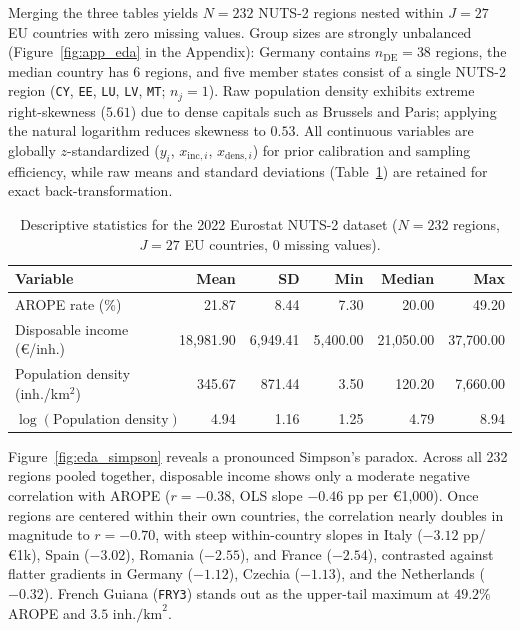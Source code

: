 \documentclass[11pt,a4paper]{article}
\begin{document}
Merging the three tables yields $N = 232$ NUTS-2 regions nested within $J = 27$ EU countries with zero missing values. Group sizes are strongly unbalanced (Figure~\ref{fig:app_eda} in the Appendix): Germany contains $n_{\text{DE}} = 38$ regions, the median country has $6$ regions, and five member states consist of a single NUTS-2 region (\texttt{CY}, \texttt{EE}, \texttt{LU}, \texttt{LV}, \texttt{MT}; $n_j = 1$). Raw population density exhibits extreme right-skewness ($5.61$) due to dense capitals such as Brussels and Paris; applying the natural logarithm reduces skewness to $0.53$. All continuous variables are globally $z$-standardized ($y_i$, $x_{\text{inc}, i}$, $x_{\text{dens}, i}$) for prior calibration and sampling efficiency, while raw means and standard deviations (Table~\ref{tab:eda}) are retained for exact back-transformation.

\begin{table}[H]
\centering
\caption{Descriptive statistics for the 2022 Eurostat NUTS-2 dataset ($N = 232$ regions, $J = 27$ EU countries, 0 missing values).}
\label{tab:eda}
\begin{tabular}{lrrrrr}
\toprule
Variable & Mean & SD & Min & Median & Max \\
\midrule
AROPE rate (\%) & 21.87 & 8.44 & 7.30 & 20.00 & 49.20 \\
Disposable income (\euro{}/inh.) & 18,981.90 & 6,949.41 & 5,400.00 & 21,050.00 & 37,700.00 \\
Population density (inh./km$^2$) & 345.67 & 871.44 & 3.50 & 120.20 & 7,660.00 \\
$\log(\text{Population density})$ & 4.94 & 1.16 & 1.25 & 4.79 & 8.94 \\
\bottomrule
\end{tabular}
\end{table}

Figure~\ref{fig:eda_simpson} reveals a pronounced Simpson's paradox. Across all 232 regions pooled together, disposable income shows only a moderate negative correlation with AROPE ($r = -0.38$, OLS slope $-0.46\text{ pp}$ per \euro{}1,000). Once regions are centered within their own countries, the correlation nearly doubles in magnitude to $r = -0.70$, with steep within-country slopes in Italy ($-3.12\text{ pp}$/\euro{}1k), Spain ($-3.02$), Romania ($-2.55$), and France ($-2.54$), contrasted against flatter gradients in Germany ($-1.12$), Czechia ($-1.13$), and the Netherlands ($-0.32$). French Guiana (\texttt{FRY3}) stands out as the upper-tail maximum at $49.2\%$ AROPE and $3.5\text{ inh./km}^2$.
\end{document}
